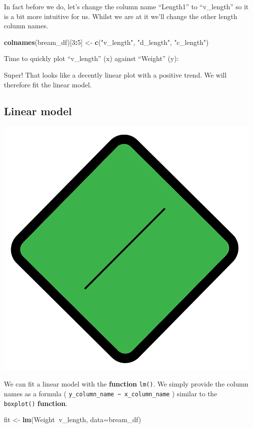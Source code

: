 \documentclass[]{book}
\newenvironment{Shaded}{\begin{snugshade}}{\end{snugshade}}
\newcommand{\KeywordTok}[1]{\textcolor[rgb]{0.13,0.29,0.53}{\textbf{#1}}}
\newcommand{\DataTypeTok}[1]{\textcolor[rgb]{0.13,0.29,0.53}{#1}}
\newcommand{\DecValTok}[1]{\textcolor[rgb]{0.00,0.00,0.81}{#1}}
\newcommand{\StringTok}[1]{\textcolor[rgb]{0.31,0.60,0.02}{#1}}
\newcommand{\OperatorTok}[1]{\textcolor[rgb]{0.81,0.36,0.00}{\textbf{#1}}}
\newcommand{\NormalTok}[1]{#1}
\begin{document}
In fact before we do, let's change the column name ``Length1'' to
``v\_length'' so it is a bit more intuitive for us. Whilst we are at it
we'll change the other length column names.

\begin{Shaded}
\begin{Highlighting}[]
\KeywordTok{colnames}\NormalTok{(bream_df)[}\DecValTok{3}\OperatorTok{:}\DecValTok{5}\NormalTok{] <-}\StringTok{ }\KeywordTok{c}\NormalTok{(}\StringTok{"v_length"}\NormalTok{, }\StringTok{"d_length"}\NormalTok{, }\StringTok{"c_length"}\NormalTok{)}
\end{Highlighting}
\end{Shaded}

Time to quickly plot ``v\_length'' (x) against ``Weight'' (y):

\begin{Shaded}
\end{Shaded}

Super! That looks like a decently linear plot with a positive trend. We
will therefore fit the linear model.

\subsection{Linear model}\label{linear-model}

\begin{center}\includegraphics[width=0.2\linewidth]{figures/lm} \end{center}

We can fit a linear model with the \textbf{function} \texttt{lm()}. We
simply provide the column names as a formula (
\texttt{y\_column\_name\ \textasciitilde{}\ x\_column\_name} ) similar
to the \texttt{boxplot()} \textbf{function}.

\begin{Shaded}
\begin{Highlighting}[]
\NormalTok{fit <-}\StringTok{ }\KeywordTok{lm}\NormalTok{(Weight}\OperatorTok{~}\NormalTok{v_length, }\DataTypeTok{data=}\NormalTok{bream_df)}
\end{Highlighting}
\end{Shaded}
\end{document}
